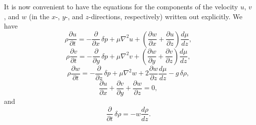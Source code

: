 It is now convenient to have the equations for the components of the velocity $u$, $v$, and $w$ (in the $x$-, $y$-, and $z$-directions, respectively) written out explicitly. We have
\begin{equation}
\label{eq:10-8}
\rho\frac{\partial u}{\partial t} = -\frac{\partial}{\partial x}\,\delta p + \mu\nabla^2 u + \left(\frac{\partial w}{\partial x}+\frac{\partial u}{\partial z}\right)\frac{d\mu}{dz},
\end{equation}
\begin{equation}
\label{eq:10-9}
\rho\frac{\partial v}{\partial t} = -\frac{\partial}{\partial y}\,\delta p + \mu\nabla^2 v + \left(\frac{\partial w}{\partial y}+\frac{\partial v}{\partial z}\right)\frac{d\mu}{dz},
\end{equation}
\begin{equation}
\label{eq:10-10}
\rho\frac{\partial w}{\partial t} = -\frac{\partial}{\partial z}\,\delta p + \mu\nabla^2 w + 2\frac{\partial w}{\partial z}\frac{d\mu}{dz} - g\,\delta\rho,
\end{equation}
\begin{equation}
\label{eq:10-11}
\frac{\partial u}{\partial x}+\frac{\partial v}{\partial y}+\frac{\partial w}{\partial z} = 0,
\end{equation}
and
\begin{equation}
\label{eq:10-12}
\frac{\partial}{\partial t}\,\delta\rho = -w\frac{d\rho}{dz}.
\end{equation}

